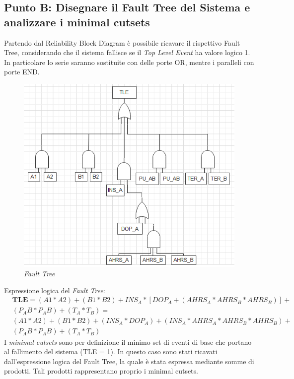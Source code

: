 \subsection{Punto B: Disegnare il Fault Tree del Sistema e analizzare i minimal cutsets}
Partendo dal Reliability Block Diagram è possibile ricavare il rispettivo Fault Tree, considerando che il sistema fallisce se il \textit{Top Level Event} ha valore logico 1.
\\In particolare lo serie saranno sostituite con delle porte OR, mentre i paralleli con porte END. 
\begin{figure}[H]
	\centering
	\includegraphics[width=\textwidth]{img/hw5/es5_FT.png}
	\caption{\textit{Fault Tree}}
\end{figure}
Espressione logica del \textit{Fault Tree}:
\begin{equation*}
	\begin{split}
		&\textbf{TLE} = (A1*A2)+(B1*B2)+{INS_A*[DOP_A+(AHRS_A*AHRS_B*AHRS_B)]}+ \\
		&(P_AB*P_AB)+(T_A*T_B) = \\
		&(A1*A2)+(B1*B2)+(INS_A*DOP_A)+(INS_A*AHRS_A*AHRS_B*AHRS_B)+ \\
		&(P_AB*P_AB)+(T_A*T_B)
	\end{split}
\end{equation*}
I \textit{minimal cutsets} sono per definizione il minimo set di eventi di base che portano al fallimento del sistema (TLE = 1). In questo caso sono stati ricavati dall'espressione logica del Fault Tree, la quale è stata espressa mediante somme di prodotti. Tali prodotti rappresentano proprio i minimal cutsets.
